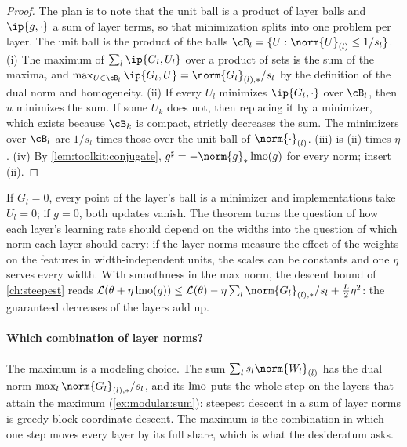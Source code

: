 \begin{refsection}
\begin{proof}
The plan is to note that the unit ball is a product of layer balls and $\ip{g,\cdot}$ a sum of layer terms, so that minimization splits into one problem per layer. The unit ball is the product of the balls $\cB_l=\{U:\norm{U}_{(l)}\le1/s_l\}$. (i) The maximum of $\sum_l\ip{G_l,U_l}$ over a product of sets is the sum of the maxima, and $\max_{U\in\cB_l}\ip{G_l,U}=\norm{G_l}_{(l),*}/s_l$ by the definition of the dual norm and homogeneity. (ii) If every $U_l$ minimizes $\ip{G_l,\cdot}$ over $\cB_l$, then $u$ minimizes the sum. If some $U_k$ does not, then replacing it by a minimizer, which exists because $\cB_k$ is compact, strictly decreases the sum. The minimizers over $\cB_l$ are $1/s_l$ times those over the unit ball of $\norm{\cdot}_{(l)}$. (iii) is (ii) times $\eta$. (iv) By \cref{lem:toolkit:conjugate}, $g^\sharp=-\norm{g}_*\lmo(g)$ for every norm; insert (ii).
\end{proof}

If $G_l=0$, every point of the layer's ball is a minimizer and implementations take $U_l=0$; if $g=0$, both updates vanish. The theorem turns the question of how each layer's learning rate should depend on the widths into the question of which norm each layer should carry: if the layer norms measure the effect of the weights on the features in width-independent units, the scales can be constants and one $\eta$ serves every width. With smoothness in the max norm, the descent bound of \cref{ch:steepest} reads $\Loss(\theta+\eta\lmo(g))\le\Loss(\theta)-\eta\sum_l\norm{G_l}_{(l),*}/s_l+\frac L2\eta^2$: the guaranteed decreases of the layers add up.

\paragraph{Which combination of layer norms?} The maximum is a modeling choice. The sum $\sum_ls_l\norm{W_l}_{(l)}$ has the dual norm $\max_l\norm{G_l}_{(l),*}/s_l$, and its $\operatorname{lmo}$ puts the whole step on the layers that attain the maximum (\cref{ex:modular:sum}): steepest descent in a sum of layer norms is greedy block-coordinate descent. The maximum is the combination in which one step moves every layer by its full share, which is what the desideratum asks.


\end{refsection}
